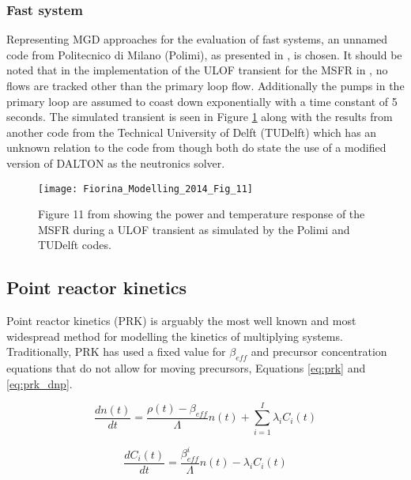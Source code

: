 \documentclass[review]{elsarticle}
\begin{document}
\subsubsection{Fast system} \label{sssec:mgd_fs}
Representing MGD approaches for the evaluation of fast systems, an unnamed code
from Politecnico di Milano (Polimi), as presented in \cite{fiorina_modelling_2014}, is
chosen. It should be noted that in the implementation of the ULOF transient for
the MSFR in \cite{fiorina_modelling_2014}, no flows are tracked other than the primary
loop flow. Additionally the pumps in the primary loop are assumed to
coast down exponentially with a time constant of 5 seconds. The simulated transient is
seen in Figure \ref{fig:fiorina_msfr_ulof} along with the results from another
code from the Technical University of Delft (TUDelft) which has an unknown relation to
the code from \cite{kophazi_development_2009} though both do state the use of a
modified version of DALTON as the neutronics solver. 

\begin{figure}[H]
   \centering
   \texttt{[image: Fiorina\_Modelling\_2014\_Fig\_11]}
   \caption{Figure 11 from \cite{fiorina_modelling_2014} showing the power and temperature
   response of the MSFR during a ULOF transient as simulated by the Polimi and TUDelft codes.} 
   \label{fig:fiorina_msfr_ulof}
\end{figure}

\subsection{Point reactor kinetics} \label{ssec:prk}
Point reactor kinetics (PRK) is arguably the most well known and most widespread
method for modelling the kinetics of multiplying systems. Traditionally, PRK
has used a fixed value for $\beta_{eff}$ and precursor concentration equations
that do not allow for moving precursors, Equations \ref{eq:prk} and
\ref{eq:prk_dnp}.

\begin{equation}
    \label{eq:prk}
    \frac{dn(t)}{dt} = \frac{\rho(t) - \beta_{eff}}{\Lambda} n(t) +
     \sum_{i = 1}^{I} \lambda_{i} C_{i}(t)
\end{equation}

\begin{equation}
    \label{eq:prk_dnp}
    \frac{dC_{i}(t)}{dt} = \frac{\beta_{eff}^{i}}{\Lambda} n(t) -
        \lambda_{i} C_{i}(t)
\end{equation}
\end{document}
